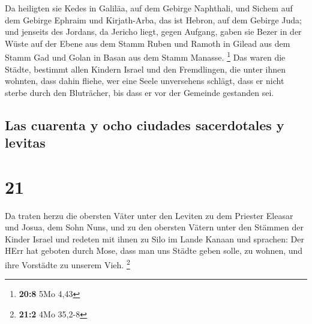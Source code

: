  Da heiligten sie Kedes in Galiläa, auf dem Gebirge
Naphthali, und Sichem auf dem Gebirge Ephraim und Kirjath-Arba, das ist
Hebron, auf dem Gebirge Juda;  und jenseits des Jordans,
da Jericho liegt, gegen Aufgang, gaben sie Bezer in der Wüste auf der
Ebene aus dem Stamm Ruben und Ramoth in Gilead aus dem Stamm Gad und
Golan in Basan aus dem Stamm Manasse. \footnote{\textbf{20:8} 5Mo 4,43}
 Das waren die Städte, bestimmt allen Kindern Israel und
den Fremdlingen, die unter ihnen wohnten, dass dahin fliehe, wer eine
Seele unversehens schlägt, dass er nicht sterbe durch den Bluträcher,
bis dass er vor der Gemeinde gestanden sei.

\hypertarget{las-cuarenta-y-ocho-ciudades-sacerdotales-y-levitas}{%
\subsection{Las cuarenta y ocho ciudades sacerdotales y
levitas}\label{las-cuarenta-y-ocho-ciudades-sacerdotales-y-levitas}}

\hypertarget{section-20}{%
\section{21}\label{section-20}}

 Da traten herzu die obersten Väter unter den Leviten zu
dem Priester Eleasar und Josua, dem Sohn Nuns, und zu den obersten
Vätern unter den Stämmen der Kinder Israel  und redeten
mit ihnen zu Silo im Lande Kanaan und sprachen: Der HErr hat geboten
durch Mose, dass man uns Städte geben solle, zu wohnen, und ihre
Vorstädte zu unserem Vieh. \footnote{\textbf{21:2} 4Mo 35,2-8}

